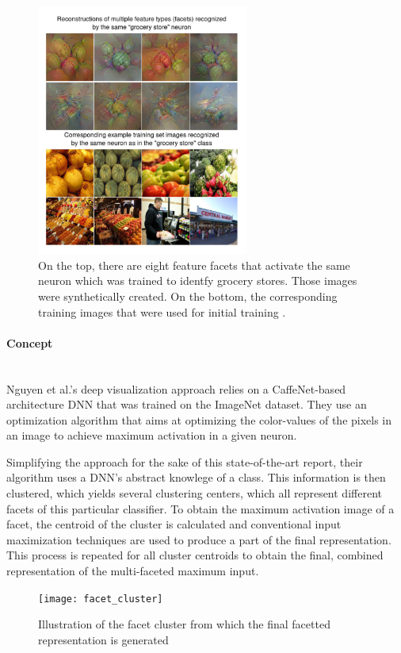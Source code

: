 \documentclass{acmsiggraph}               %
\newcommand{\paragraphbr}[1]{\paragraph{#1}\mbox{}\\}
\begin{document}
\begin{figure}[H]
\center
\includegraphics[width=2.75in]{multi-facet}
\caption{On the top, there are eight feature facets that activate the same neuron which was trained to identfy grocery stores. Those images were synthetically created. On the bottom, the corresponding training images that were used for initial training \protect\cite{Nguyen2016}.}
\label{fig:multi}
\end{figure}

\paragraphbr{Concept}

Nguyen et al.'s deep visualization approach relies on a CaffeNet-based architecture DNN that was trained on the ImageNet dataset. They use an optimization algorithm that aims at optimizing the color-values of the pixels in an image to achieve maximum activation in a given neuron.

Simplifying the approach for the sake of this state-of-the-art report, their algorithm uses a DNN's abstract knowlege of a class. This information is then clustered, which yields several clustering centers, which all represent different facets of this particular classifier. To obtain the maximum activation image of a facet, the centroid of the cluster is calculated and conventional input maximization techniques are used to produce a part of the final representation. This process is repeated for all cluster centroids to obtain the final, combined representation of the multi-faceted maximum input.

\begin{figure}
\center
\texttt{[image: facet\_cluster]}
\caption{Illustration of the facet cluster from which the final facetted representation is generated \protect\cite{Nguyen2016}}
\label{fig:facet_cluster}
\end{figure}
\end{document}
